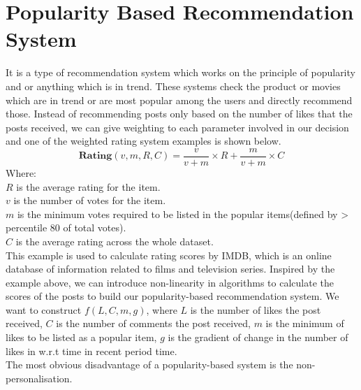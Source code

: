\section{Popularity Based Recommendation System}
It is a type of recommendation system which works on the principle of popularity and or anything which is in trend. These systems check the product or movies which are in trend or are most popular among the users and directly recommend those. 
Instead of recommending posts only based on the number of likes that the posts received, we can give weighting to each parameter involved in our decision and one of the weighted rating system examples is shown below.
\begin{equation}
\textbf{Rating}(v,m,R,C) = \frac{v}{v+m} \times R + \frac{m}{v+m} \times C
\end{equation}
Where:
\\$R$ is the average rating for the item.
\\$v$ is the number of votes for the item.
\\$m$ is the minimum votes required to be listed in the popular items(defined by > percentile 80 of total votes).
\\$C$ is the average rating across the whole dataset.
\\This example is used to calculate rating scores by IMDB, which is an online database of information related to films and television series.
Inspired by the example above, we can introduce non-linearity in algorithms to calculate the scores of the posts to build our popularity-based recommendation system.
We want to construct $f(L,C,m,g)$, where $L$ is the number of likes the post received, $C$ is the number of comments the post received, 
$m$ is the minimum of likes to be listed as a popular item, $g$ is the gradient of change in the number of likes in w.r.t time in recent period time.
\\The most obvious disadvantage of a popularity-based system is the non-personalisation.




